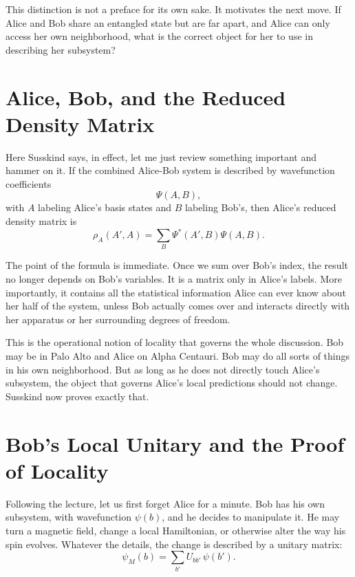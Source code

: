 This distinction is not a preface for its own sake. It motivates the next move. If Alice and Bob share an entangled state but are far apart, and Alice can only access her own neighborhood, what is the correct object for her to use in describing her subsystem?

\section{Alice, Bob, and the Reduced Density Matrix}

Here Susskind says, in effect, let me just review something important and hammer on it. If the combined Alice-Bob system is described by wavefunction coefficients
\begin{equation}
\Psi(A,B),
\end{equation}
with \(A\) labeling Alice's basis states and \(B\) labeling Bob's, then Alice's reduced density matrix is
\begin{equation}
\rho_A(A',A)=\sum_B \Psi^*(A',B)\Psi(A,B).
\end{equation}

The point of the formula is immediate. Once we sum over Bob's index, the result no longer depends on Bob's variables. It is a matrix only in Alice's labels. More importantly, it contains all the statistical information Alice can ever know about her half of the system, unless Bob actually comes over and interacts directly with her apparatus or her surrounding degrees of freedom.

This is the operational notion of locality that governs the whole discussion. Bob may be in Palo Alto and Alice on Alpha Centauri. Bob may do all sorts of things in his own neighborhood. But as long as he does not directly touch Alice's subsystem, the object that governs Alice's local predictions should not change. Susskind now proves exactly that.

\section{Bob's Local Unitary and the Proof of Locality}

Following the lecture, let us first forget Alice for a minute. Bob has his own subsystem, with wavefunction \(\psi(b)\), and he decides to manipulate it. He may turn a magnetic field, change a local Hamiltonian, or otherwise alter the way his spin evolves. Whatever the details, the change is described by a unitary matrix:
\begin{equation}
\psi_M(b)=\sum_{b'}U_{bb'}\,\psi(b').
\end{equation}

